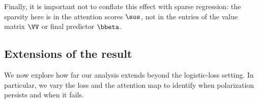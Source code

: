 \documentclass{article}
\theoremstyle{plain}
\theoremstyle{definition}
\theoremstyle{remark}
\begin{document}
Finally, it is important not to conflate this effect with sparse regression: the sparsity here is in the attention scores $\sos$, not in the entries of the value matrix $\VV$ or final predictor $\bbeta$.


\subsection{Extensions of the result}
\label{sec:extensions}
%
We now explore how far our analysis extends beyond the logistic-loss setting. In particular, we vary the loss and the attention map to identify when polarization persists and when it fails.
%
\end{document}
